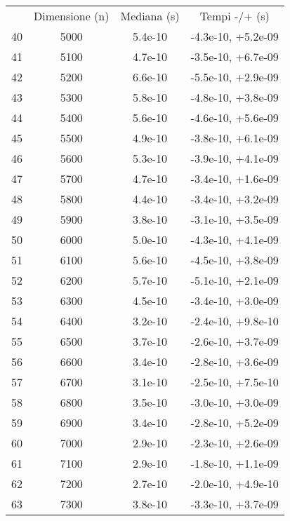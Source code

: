 \begin{table}
\centering
\begin{adjustbox}{width=1\textwidth/2}
\begin{tabular}{|c|c|c|c|}
\hline
 & Dimensione (n) & Mediana (s) & Tempi -/+ (s) \\
40 & 5000 & 5.4e-10 & -4.3e-10, +5.2e-09 \\
\cline{1-4}
41 & 5100 & 4.7e-10 & -3.5e-10, +6.7e-09 \\
\cline{1-4}
42 & 5200 & 6.6e-10 & -5.5e-10, +2.9e-09 \\
\cline{1-4}
43 & 5300 & 5.8e-10 & -4.8e-10, +3.8e-09 \\
\cline{1-4}
44 & 5400 & 5.6e-10 & -4.6e-10, +5.6e-09 \\
\cline{1-4}
45 & 5500 & 4.9e-10 & -3.8e-10, +6.1e-09 \\
\cline{1-4}
46 & 5600 & 5.3e-10 & -3.9e-10, +4.1e-09 \\
\cline{1-4}
47 & 5700 & 4.7e-10 & -3.4e-10, +1.6e-09 \\
\cline{1-4}
48 & 5800 & 4.4e-10 & -3.4e-10, +3.2e-09 \\
\cline{1-4}
49 & 5900 & 3.8e-10 & -3.1e-10, +3.5e-09 \\
\cline{1-4}
50 & 6000 & 5.0e-10 & -4.3e-10, +4.1e-09 \\
\cline{1-4}
51 & 6100 & 5.6e-10 & -4.5e-10, +3.8e-09 \\
\cline{1-4}
52 & 6200 & 5.7e-10 & -5.1e-10, +2.1e-09 \\
\cline{1-4}
53 & 6300 & 4.5e-10 & -3.4e-10, +3.0e-09 \\
\cline{1-4}
54 & 6400 & 3.2e-10 & -2.4e-10, +9.8e-10 \\
\cline{1-4}
55 & 6500 & 3.7e-10 & -2.6e-10, +3.7e-09 \\
\cline{1-4}
56 & 6600 & 3.4e-10 & -2.8e-10, +3.6e-09 \\
\cline{1-4}
57 & 6700 & 3.1e-10 & -2.5e-10, +7.5e-10 \\
\cline{1-4}
58 & 6800 & 3.5e-10 & -3.0e-10, +3.0e-09 \\
\cline{1-4}
59 & 6900 & 3.4e-10 & -2.8e-10, +5.2e-09 \\
\cline{1-4}
60 & 7000 & 2.9e-10 & -2.3e-10, +2.6e-09 \\
\cline{1-4}
61 & 7100 & 2.9e-10 & -1.8e-10, +1.1e-09 \\
\cline{1-4}
62 & 7200 & 2.7e-10 & -2.0e-10, +4.9e-10 \\
\cline{1-4}
63 & 7300 & 3.8e-10 & -3.3e-10, +3.7e-09 \\

\end{tabular}
\end{adjustbox}
\end{table}
